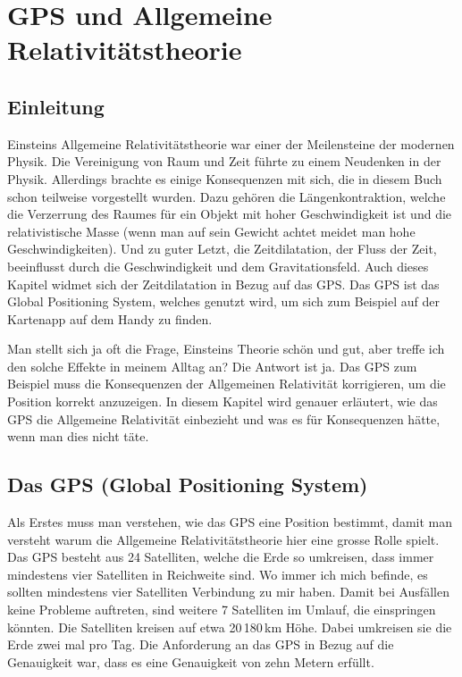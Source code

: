 
\chapter{GPS und Allgemeine Relativitätstheorie\label{chapter:gps}}
\begin{refsection}

\section{Einleitung}
Einsteins Allgemeine Relativitätstheorie war einer der Meilensteine der modernen Physik. Die Vereinigung von Raum und Zeit führte zu einem Neudenken in der Physik. Allerdings brachte es einige Konsequenzen mit sich, die in diesem Buch schon teilweise vorgestellt wurden. Dazu gehören die Längenkontraktion, welche die Verzerrung des Raumes für ein Objekt mit hoher Geschwindigkeit ist und die relativistische Masse (wenn man auf sein Gewicht achtet meidet man hohe Geschwindigkeiten). Und zu guter Letzt, die Zeitdilatation, der Fluss der Zeit, beeinflusst durch die Geschwindigkeit und dem Gravitationsfeld. Auch dieses Kapitel widmet sich der Zeitdilatation in Bezug auf das GPS. Das GPS ist das Global Positioning System, welches genutzt wird, um sich zum Beispiel auf der Kartenapp auf dem Handy zu finden.
%
%

Man stellt sich ja oft die Frage, Einsteins Theorie schön und gut, aber treffe ich den solche Effekte in meinem Alltag an? Die Antwort ist ja. Das GPS zum Beispiel muss die Konsequenzen der Allgemeinen Relativität korrigieren, um die Position korrekt anzuzeigen. In diesem Kapitel wird genauer erläutert, wie das GPS die Allgemeine Relativität einbezieht und was es für Konsequenzen hätte, wenn man dies nicht täte.

\section{Das GPS (Global Positioning System)}
Als Erstes muss man verstehen, wie das GPS eine Position bestimmt, damit man versteht warum die Allgemeine Relativitätstheorie hier eine grosse Rolle spielt. Das GPS besteht aus 24 Satelliten, welche die Erde so umkreisen, dass immer mindestens vier Satelliten in Reichweite sind. Wo immer ich mich befinde, es sollten mindestens vier Satelliten Verbindung zu mir haben. Damit bei Ausfällen keine Probleme auftreten, sind weitere 7 Satelliten im Umlauf, die einspringen könnten. Die Satelliten kreisen auf etwa 20\,180\,km Höhe. Dabei umkreisen sie die Erde zwei mal pro Tag. Die Anforderung an das GPS in Bezug auf die Genauigkeit war, dass es eine Genauigkeit von zehn Metern erfüllt. 


\end{refsection}
